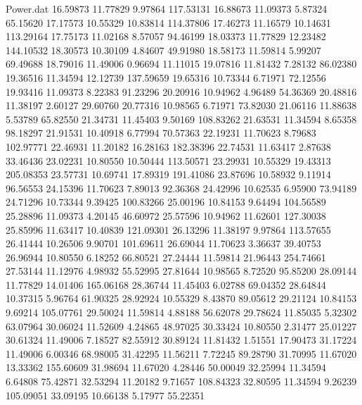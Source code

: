 \begin{filecontents}{Power.dat}
  16.59873   11.77829    9.97864  117.53131
  16.88673   11.09373    5.87324   65.15620
  17.17573   10.55329   10.83814  114.37806
  17.46273   11.16579   10.14631  113.29164
  17.75173   11.02168    8.57057   94.46199
  18.03373   11.77829   12.23482  144.10532
  18.30573   10.30109    4.84607   49.91980
  18.58173   11.59814    5.99207   69.49688
  18.79016   11.49006    0.96694   11.11015
  19.07816   11.81432    7.28132   86.02380
  19.36516   11.34594   12.12739  137.59659
  19.65316   10.73344    6.71971   72.12556
  19.93416   11.09373    8.22383   91.23296
  20.20916   10.94962    4.96489   54.36369
  20.48816   11.38197    2.60127   29.60760
  20.77316   10.98565    6.71971   73.82030
  21.06116   11.88638    5.53789   65.82550
  21.34731   11.45403    9.50169  108.83262
  21.63531   11.34594    8.65358   98.18297
  21.91531   10.40918    6.77994   70.57363
  22.19231   11.70623    8.79683  102.97771
  22.46931   11.20182   16.28163  182.38396
  22.74531   11.63417    2.87638   33.46436
  23.02231   10.80550   10.50444  113.50571
  23.29931   10.55329   19.43313  205.08353
  23.57731   10.69741   17.89319  191.41086
  23.87696   10.58932    9.11914   96.56553
  24.15396   11.70623    7.89013   92.36368
  24.42996   10.62535    6.95900   73.94189
  24.71296   10.73344    9.39425  100.83266
  25.00196   10.84153    9.64494  104.56589
  25.28896   11.09373    4.20145   46.60972
  25.57596   10.94962   11.62601  127.30038
  25.85996   11.63417   10.40839  121.09301
  26.13296   11.38197    9.97864  113.57655
  26.41444   10.26506    9.90701  101.69611
  26.69044   11.70623    3.36637   39.40753
  26.96944   10.80550    6.18252   66.80521
  27.24444   11.59814   21.96443  254.74661
  27.53144   11.12976    4.98932   55.52995
  27.81644   10.98565    8.72520   95.85200
  28.09144   11.77829   14.01406  165.06168
  28.36744   11.45403    6.02788   69.04352
  28.64844   10.37315    5.96764   61.90325
  28.92924   10.55329    8.43870   89.05612
  29.21124   10.84153    9.69214  105.07761
  29.50024   11.59814    4.88188   56.62078
  29.78624   11.85035    5.32302   63.07964
  30.06024   11.52609    4.24865   48.97025
  30.33424   10.80550    2.31477   25.01227
  30.61324   11.49006    7.18527   82.55912
  30.89124   11.81432    1.51551   17.90473
  31.17224   11.49006    6.00346   68.98005
  31.42295   11.56211    7.72245   89.28790
  31.70995   11.67020   13.33362  155.60609
  31.98694   11.67020    4.28446   50.00049
  32.25994   11.34594    6.64808   75.42871
  32.53294   11.20182    9.71657  108.84323
  32.80595   11.34594    9.26239  105.09051
  33.09195   10.66138    5.17977   55.22351

\end{filecontents}
